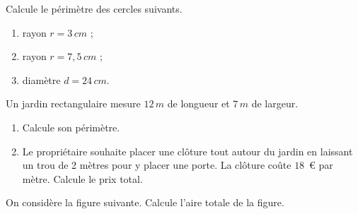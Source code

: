\documentclass[../../syllabus_1.tex]{subfiles}
\begin{document}
\begin{exercise}
    Calcule le périmètre des cercles suivants.
    \begin{enumerate}[itemsep=1.5cm]
        \item rayon $r=3\,cm$ ;
        \item rayon $r=7,5\,cm$ ;
        \item diamètre $d=24\,cm$.
        \vspace{1cm}
    \end{enumerate}
\end{exercise}

\begin{exercise}
    Un jardin rectangulaire mesure $12\,m$ de longueur et $7\,m$
    de largeur.

    \begin{enumerate}[itemsep=1.5cm]
        \item Calcule son périmètre.
        \item Le propriétaire souhaite placer une clôture tout autour
        du jardin en laissant un trou de 2 mètres pour y placer une porte. La clôture coûte $18\,$ € par mètre. Calcule le prix total.
    \end{enumerate}
\end{exercise}

\newpage
\begin{exercise}
    On considère la figure suivante. Calcule l'aire totale de la figure.
    \begin{center}
    \end{center}
    \vspace{4cm}
\end{exercise}
\end{document}
